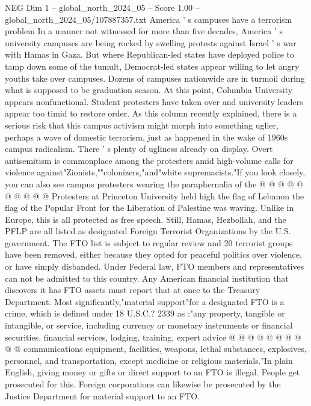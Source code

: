 \begin{textsample}{NEG Dim 1 – global\_north\_2024\_05 – Score 1.00 – global\_north\_2024\_05/107887357.txt}  \label{ex:f1_neg_054}
America ' s campuses have a terrorism problem In a manner not witnessed for more than five decades, America ' s university campuses are being rocked by swelling protests against Israel ' s war with Hamas in Gaza.
But where Republican-led states have deployed police to tamp down some of the tumult, Democrat-led states appear willing to let angry youths take over campuses.
Dozens of campuses nationwide are in turmoil during what is supposed to be graduation season.
At this point, Columbia University appears nonfunctional.
Student protesters have taken over and university leaders appear too timid to restore order.
As this column recently explained, there is a serious risk that this campus activism might morph into something uglier, perhaps a wave of domestic terrorism, just as happened in the wake of 1960s campus radicalism.
There ' s plenty of ugliness already on display.
Overt antisemitism is commonplace among the protesters amid high-volume calls for violence against"Zionists,""colonizers,"and"white supremacists."If you look closely, you can also see campus protesters wearing the paraphernalia of the @ @ @ @ @ @ @ @ @ @ Protesters at Princeton University held high the flag of Lebanon the flag of the Popular Front for the Liberation of Palestine was waving.
Unlike in Europe, this is all protected as free speech.
Still, Hamas, Hezbollah, and the PFLP are all listed as designated Foreign Terrorist Organizations by the U.S. government.
The FTO list is subject to regular review and 20 terrorist groups have been removed, either because they opted for peaceful politics over violence, or have simply disbanded.
Under Federal law, FTO members and representatives can not be admitted to this country.
Any American financial institution that discovers it has FTO assets must report that at once to the Treasury Department.
Most significantly,"material support"for a designated FTO is a crime, which is defined under 18 U.S.C.? 2339 as :"any property, tangible or intangible, or service, including currency or monetary instruments or financial securities, financial services, lodging, training, expert advice @ @ @ @ @ @ @ @ @ @ communications equipment, facilities, weapons, lethal substances, explosives, personnel, and transportation, except medicine or religious materials."In plain English, giving money or gifts or direct support to an FTO is illegal.
People get prosecuted for this.
Foreign corporations can likewise be prosecuted by the Justice Department for material support to an FTO.

\end{textsample}
